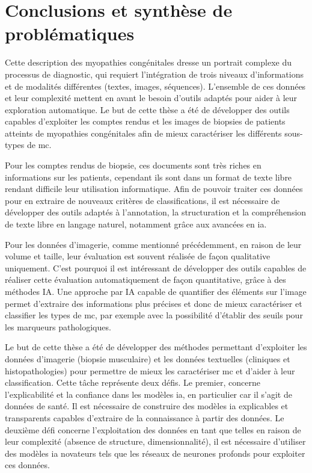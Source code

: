 \section{Conclusions et synthèse de problématiques}
Cette description des myopathies congénitales dresse un portrait complexe du processus de diagnostic, qui requiert l'intégration de trois niveaux d'informations et de modalités différentes (textes, images, séquences). L'ensemble de ces données et leur complexité mettent en avant le besoin d'outils adaptés pour aider à leur exploration automatique.  Le but de cette thèse a été de développer des outils capables d'exploiter les comptes rendus et les images de biopsies de patients atteints de myopathies congénitales afin de mieux caractériser les différents sous-types de \gls{mc}.

Pour les comptes rendus de biopsie, ces documents sont très riches en informations sur les patients, cependant ils sont dans un format de texte libre rendant difficile leur utilisation informatique. Afin de pouvoir traiter ces données pour en extraire de nouveaux critères de classifications, il est nécessaire de développer des outils adaptés à l'annotation, la structuration et la compréhension de texte libre en langage naturel, notamment grâce aux avancées en \gls{ia}. 

Pour les données d'imagerie, comme mentionné précédemment, en raison de leur volume et taille, leur évaluation est souvent réalisée de façon qualitative uniquement. C'est pourquoi il est intéressant de développer des outils capables de réaliser cette évaluation automatiquement de façon quantitative, grâce à des méthodes IA. Une approche par IA capable de quantifier des éléments sur l'image permet d'extraire des informations plus précises et donc de mieux caractériser et classifier les types de \gls{mc}, par exemple avec la possibilité d'établir des seuils pour les marqueurs pathologiques.

Le but de cette thèse a été de développer des méthodes permettant d'exploiter les données d'imagerie (biopsie musculaire) et les données textuelles (cliniques et histopathologies) pour permettre de mieux les caractériser  \gls{mc} et d'aider à leur classification. Cette tâche représente deux défis. Le premier, concerne l'explicabilité et la confiance dans les modèles \gls{ia}, en particulier car il s'agit de données de santé. Il est nécessaire de construire des modèles \gls{ia} explicables et transparents capables d'extraire de la connaissance à partir des données. Le deuxième défi concerne l'exploitation des données en tant que telles en raison de leur complexité (absence de structure, dimensionnalité), il est nécessaire d'utiliser des modèles \gls{ia} novateurs tels que les réseaux de neurones profonds pour exploiter ces données.

